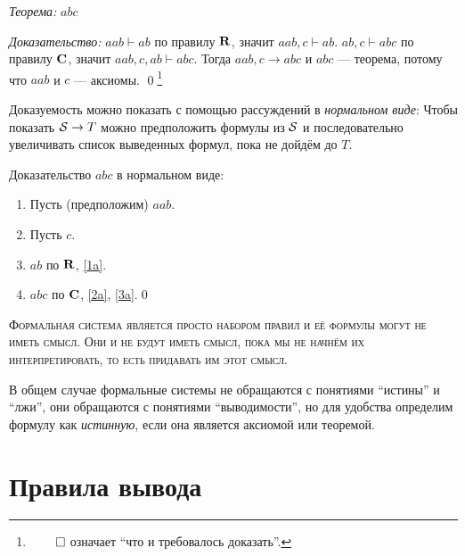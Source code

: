 {\it Теорема:} $abc$

{\it Доказательство:}
$aab\vdash ab$ по правилу $\mathbf{R}$, значит $aab,c\vdash ab$.
$ab,c\vdash abc$ по правилу $\mathbf{C}$, значит $aab,c,ab\vdash abc$.
Тогда $aab,c\to abc$ и $abc$ --- теорема, потому что $aab$ и $c$ --- аксиомы.
\qed\footnote{$\qed$ означает ``что и требовалось доказать''.}

Доказуемость можно показать с помощью рассуждений в
{\it нормальном виде}:
Чтобы показать $\mathcal S\to T$ можно предположить формулы из $\mathcal S$ и последовательно
увеличивать список выведенных формул, пока не дойдём до $T$.

\pagebreak

Доказательство $abc$ в нормальном виде:
\begin{enumerate}[label=(\arabic*)]
  \item{}\label{1a}Пусть (предположим) $aab$.
  \item{}\label{2a}Пусть $c$.
  \item{}\label{3a}$ab$ по $\mathbf{R}$, \ref{1a}.
  \item{}\label{4a}$abc$ по $\mathbf{C}$, \ref{2a}, \ref{3a}.\qed
\end{enumerate}

\textsc{Формальная система является просто набором правил и её формулы
  могут не иметь смысл. Они и не будут иметь смысл, пока мы не начнём их
  интерпретировать, то есть придавать им этот смысл.}

В общем случае формальные системы не обращаются с понятиями ``истины'' и ``лжи'',
они обращаются с понятиями ``выводимости'', но для удобства определим формулу
как {\it истинную},
если она является аксиомой или теоремой.

\section{Правила вывода}


